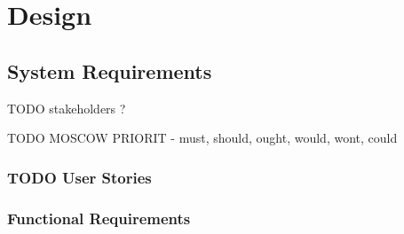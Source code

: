 \chapter{Design}

\section{System Requirements}

TODO stakeholders ?

TODO MOSCOW PRIORIT - must, should, ought, would, wont, could

\subsection{TODO User Stories}

\subsection{Functional Requirements}

